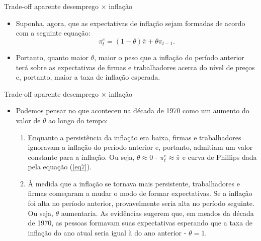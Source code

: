 \documentclass[10pt]{beamer}
\begin{document}
\begin{frame}{Trade-off aparente desemprego $\times$ inflação}
    \begin{itemize}
        \item Suponha, agora, que as expectativas de inflação sejam formadas de acordo com a seguinte equação:
        \begin{equation}
            \pi_t^e = (1 - \theta) \bar{\pi} + \theta \pi_{t-1}.
            \label{eq8}
        \end{equation}
        \bigskip
        \item Portanto, quanto maior $\theta$, maior o peso que a inflação do período anterior terá sobre as expectativas de firmas e trabalhadores acerca do nível de preços e, portanto, maior a taxa de inflação esperada.
    \end{itemize}
\end{frame}

\begin{frame}{Trade-off aparente desemprego $\times$ inflação}
    \begin{itemize}
        \item Podemos pensar no que aconteceu na década de 1970 como um aumento do valor de $\theta$ ao longo do tempo:
        \bigskip
        \begin{enumerate}
            \item Enquanto a persistência da inflação era baixa, firmas e trabalhadores ignoravam a inflação do período anterior e, portanto, admitiam um valor constante para a inflação. Ou seja, $\theta \approx 0$ - $\pi_t^e \approx \bar{\pi}$ e curva de Phillips dada pela equação (\ref{eq7}).
            \bigskip
            \item À medida que a inflação se tornava mais persistente, trabalhadores e firmas começaram a mudar o modo de formar expectativas. Se a inflação foi alta no período anterior, provavelmente seria alta no período seguinte. Ou seja, $\theta$ aumentaria. As evidências sugerem que, em meados da década de 1970, as pessoas formavam suas expectativas esperando que a taxa de inflação do ano atual seria igual à do ano anterior - $\theta = 1$.
        \end{enumerate}
    \end{itemize}
\end{frame}
\end{document}
